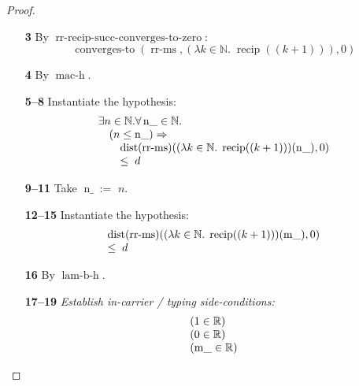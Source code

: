 \documentclass[11pt]{article}
\theoremstyle{plain}
\begin{document}
\begin{proof}
\begin{itemize}[leftmargin=2.8em, itemsep=4pt, parsep=1pt]
  \item[\textbf{3}] By $\operatorname{rr\text{-}recip\text{-}succ\text{-}converges\text{-}to\text{-}zero}$:
\begin{equation*}
\operatorname{converges\text{-}to}(\operatorname{rr\text{-}ms}, (\lambda k \in \mathbb{N}.\; \operatorname{recip}((k + 1))), 0)
\end{equation*}

  \item[\textbf{4}] By $\operatorname{mac\text{-}h}$.
  \item[\textbf{5--8}] Instantiate the hypothesis:
\begin{equation*}
\begin{array}{@{}l@{}} \exists n \in \mathbb{N}. \forall \operatorname{n\_} \in \mathbb{N}. \\ \quad (n \leq \operatorname{n\_}) \Rightarrow  \\ \quad \quad \operatorname{dist}(\operatorname{rr\text{-}ms})((\lambda k \in \mathbb{N}.\; \operatorname{recip}((k + 1)))(\operatorname{n\_}), 0) \\ \quad \quad \leq\; d \end{array}
\end{equation*}

  \item[\textbf{9--11}] Take $\operatorname{n\_} :=$ $n$.
  \item[\textbf{12--15}] Instantiate the hypothesis:
\begin{equation*}
\begin{array}{@{}l@{}} \operatorname{dist}(\operatorname{rr\text{-}ms})((\lambda k \in \mathbb{N}.\; \operatorname{recip}((k + 1)))(\operatorname{m\_}), 0) \\ \leq\; d \end{array}
\end{equation*}

  \item[\textbf{16}] By $\operatorname{lam\text{-}b\text{-}h}$.
  \item[\textbf{17--19}] \emph{Establish in-carrier / typing side-conditions:}
\begin{equation*}
\begin{array}{@{}l@{}}
(1 \in \mathbb{R}) \\
(0 \in \mathbb{R}) \\
(\operatorname{m\_} \in \mathbb{R})
\end{array}
\end{equation*}


\end{itemize}
\end{proof}
\end{document}
